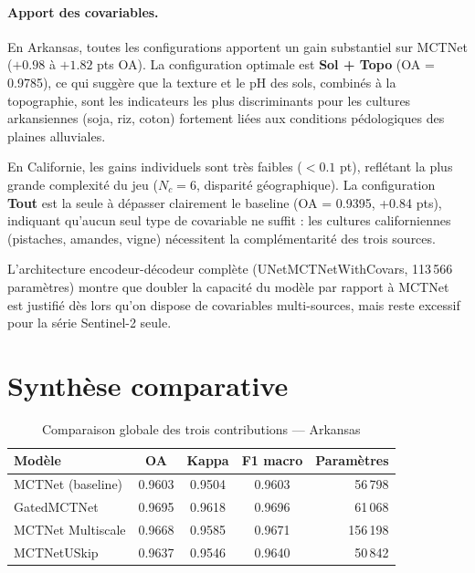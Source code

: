 \paragraph{Apport des covariables.}
En Arkansas, toutes les configurations apportent un gain substantiel sur MCTNet
($+0.98$ à $+1.82$ pts OA). La configuration optimale est \textbf{Sol + Topo}
(OA = 0.9785), ce qui suggère que la texture et le pH des sols, combinés
à la topographie, sont les indicateurs les plus discriminants pour les cultures
arkansiennes (soja, riz, coton) fortement liées aux conditions pédologiques
des plaines alluviales.

En Californie, les gains individuels sont très faibles ($< 0.1$ pt), reflétant
la plus grande complexité du jeu ($N_c = 6$, disparité géographique). La
configuration \textbf{Tout} est la seule à dépasser clairement le baseline
(OA = 0.9395, +0.84 pts), indiquant qu'aucun seul type de covariable ne
suffit : les cultures californiennes (pistaches, amandes, vigne) nécessitent
la complémentarité des trois sources.

L'architecture encodeur-décodeur complète (UNetMCTNetWithCovars, 113\,566
paramètres) montre que doubler la capacité du modèle par rapport à MCTNet
est justifié dès lors qu'on dispose de covariables multi-sources, mais
reste excessif pour la série Sentinel-2 seule.

\section{Synthèse comparative}
\label{sec:synthese}

\begin{table}[H]
\centering
\caption{Comparaison globale des trois contributions — Arkansas}
\label{tab:synthese_arkansas}
\begin{tabular}{lcccr}
\toprule
\textbf{Modèle} & \textbf{OA} & \textbf{Kappa} & \textbf{F1 macro} & \textbf{Paramètres} \\
\midrule
MCTNet (baseline) & 0.9603 & 0.9504 & 0.9603 & 56\,798 \\
GatedMCTNet       & 0.9695 & 0.9618 & 0.9696 & 61\,068 \\
MCTNet Multiscale & 0.9668 & 0.9585 & 0.9671 & 156\,198 \\
MCTNetUSkip       & 0.9637 & 0.9546 & 0.9640 & 50\,842 \\
\bottomrule
\end{tabular}
\end{table}


